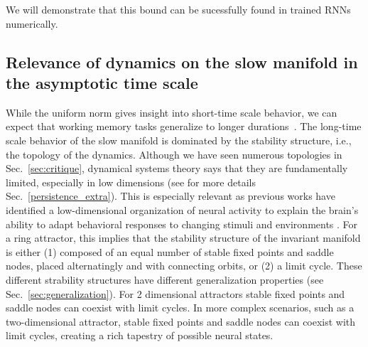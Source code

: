 \documentclass{article} %
\newcommand{\mpcomment}[1]{\textcolor{mpcolor}{(#1)}}
\newcommand{\pscomment}[1]{\textcolor{BurntOrange}{(#1)}}
\newcounter{ct}
\theoremstyle{definition}
\theoremstyle{remark}
\begin{document}
We will demonstrate that this bound can be sucessfully found in trained RNNs numerically.

\subsection{Relevance of dynamics on the slow manifold in the asymptotic time scale}\label{sec:attractor_bif}
While the uniform norm gives insight into short-time scale behavior, we can expect that working memory tasks generalize to longer durations~\citep{Park2023a}.
The long-time scale behavior of the slow manifold is dominated by the stability structure, i.e., the topology of the dynamics.
Although we have seen numerous topologies in Sec.~\ref{sec:critique}, dynamical systems theory says that they are fundamentally limited, especially in low dimensions (see for more details Sec.~\ref{persistence_extra}).
This is especially relevant as previous works have identified a low-dimensional organization of neural activity to explain the brain's ability to adapt behavioral responses to changing stimuli and environments \citep{beiran2023parametric,altan2023low,fanthomme2021low}.
For a ring attractor, this implies that the stability structure of the invariant manifold is either
(1) composed of an equal number of stable fixed points and saddle nodes, placed alternatingly and with connecting orbits, or (2) a limit cycle.
These different strability structures have different generalization properties (see Sec.~\ref{sec:generalization}).
For 2 dimensional attractors stable fixed points and saddle nodes can coexist with limit cycles.
In more complex scenarios, such as a two-dimensional attractor, stable fixed points and saddle nodes can coexist with limit cycles, creating a rich tapestry of possible neural states.
\end{document}
